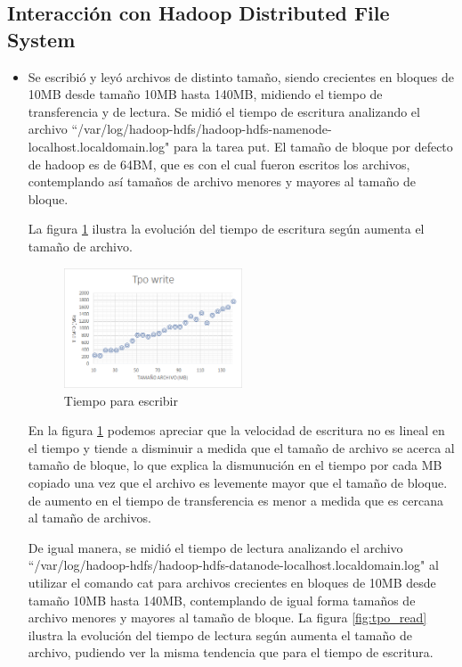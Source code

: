 \documentclass[letterpaper, 10 pt, conference]{ieeeconf}  %
\begin{document}
\subsection{Interacción con Hadoop Distributed File System}
\begin{itemize}


    \item  Se escribió y leyó archivos de distinto tamaño, siendo crecientes en bloques de 10MB desde tamaño 10MB hasta 140MB, midiendo el tiempo de transferencia y de lectura. Se midió el tiempo de escritura analizando el archivo ``/var/log/hadoop-hdfs/hadoop-hdfs-namenode-localhost.localdomain.log" para la tarea put. El tamaño de bloque por defecto de hadoop es de 64BM, que es con el cual fueron escritos los archivos, contemplando así tamaños de archivo menores y mayores al tamaño de bloque.
    
    La figura \ref{fig:tpo_write} ilustra la evolución del tiempo de escritura según aumenta el tamaño de archivo.
    \begin{figure}
      \centering
        \includegraphics[width=0.5\textwidth]{tpo_write.png}
      \caption{Tiempo para escribir}
      \label{fig:tpo_write}
    \end{figure}
    
    En la figura \ref{fig:tpo_write} podemos apreciar que la velocidad de escritura no es lineal en el tiempo y tiende a disminuir a medida que el tamaño de archivo se acerca al tamaño de bloque, lo que explica la dismunución en el tiempo por cada MB copiado una vez que el archivo es levemente mayor que el tamaño de bloque. de aumento en el tiempo de transferencia es menor a medida que es cercana al tamaño de archivos.
    
    De igual manera, se midió el tiempo de lectura analizando el archivo ``/var/log/hadoop-hdfs/hadoop-hdfs-datanode-localhost.localdomain.log" al utilizar el comando cat para archivos crecientes en bloques de 10MB desde tamaño 10MB hasta 140MB, contemplando de igual forma tamaños de archivo menores y mayores al tamaño de bloque.
    La figura \ref{fig:tpo_read} ilustra la evolución del tiempo de lectura según aumenta el tamaño de archivo, pudiendo ver la misma tendencia que para el tiempo de escritura. 
    

\end{itemize}
\end{document}
